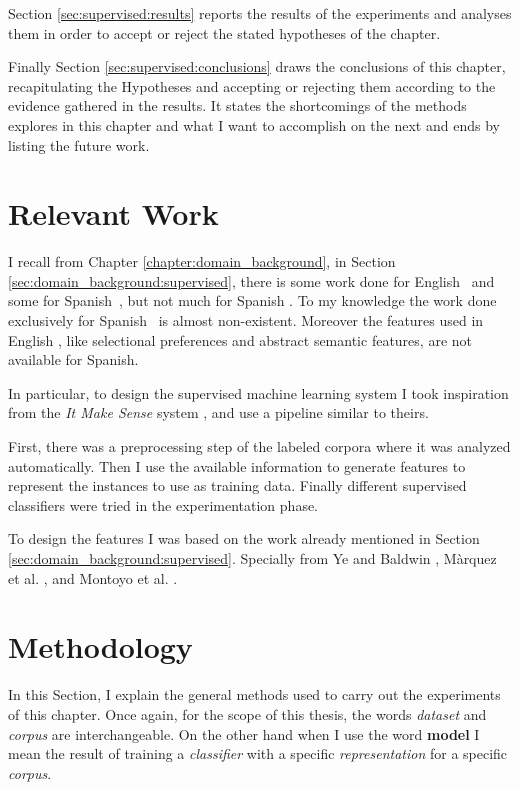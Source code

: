 Section \ref{sec:supervised:results} reports the results of the experiments and
analyses them in order to accept or reject the stated hypotheses of the
chapter.

Finally Section \ref{sec:supervised:conclusions} draws the conclusions of this
chapter, recapitulating the Hypotheses and accepting or rejecting them
according to the evidence gathered in the results. It states the shortcomings
of the methods explores in this chapter and what I want to accomplish on the
next and ends by listing the future work.

\section{Relevant Work}\label{sec:supervised:previous}

I recall from Chapter \ref{chapter:domain_background}, in Section
\ref{sec:domain_background:supervised}, there is some work done for English
\vsd~and some for Spanish~\wsd, but not much for Spanish \vsd. To my knowledge
the work done exclusively for Spanish \vsd~is almost non-existent. Moreover the
features used in English \vsd, like selectional preferences and abstract
semantic features, are not available for Spanish.

In particular, to design the supervised machine learning system I took
inspiration from the {\em It Make Sense} system
\cite{Zhong:2010:MSW:1858933.1858947}, and use a pipeline similar to theirs.

First, there was a preprocessing step of the labeled corpora where it was
analyzed automatically. Then I use the available information to generate
features to represent the instances to use as training data. Finally
different supervised classifiers were tried in the experimentation phase.

To design the features I was based on the work already mentioned in Section
\ref{sec:domain_background:supervised}. Specially from Ye and Baldwin
\cite{Ye:2006:ALTA2006}, M\`arquez et al. \cite{marquez07a}, and Montoyo et al.
\cite{DBLP:journals/corr/abs-1109-2130}.

\section{Methodology}\label{sec:supervised:methodology}

In this Section, I explain the general methods used to carry out the
experiments of this chapter. Once again, for the scope of this thesis, the
words {\em dataset} and {\em corpus} are interchangeable. On the other hand
when I use the word {\bf model} I mean the result of training a {\em
classifier} with a specific {\em representation} for a specific {\em corpus}.
 
